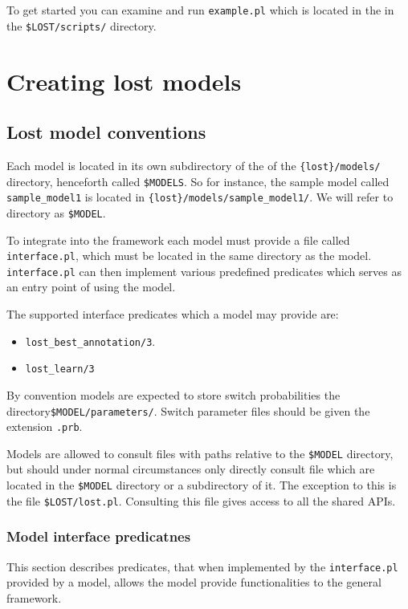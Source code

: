 \documentclass{book}
\begin{document}
To get started you can examine and run \texttt{example.pl} which 
is located in the in the \texttt{\$LOST/scripts/} directory.

\chapter{Creating lost models}

\section{Lost model conventions}\label{sec:lost_model_conventions}

Each model is located in its own subdirectory of the of the
\texttt{\{lost\}/models/} directory, henceforth called \texttt{\$MODELS}. 
So for instance, the sample model called \texttt{sample\_model1} is located in
\texttt{\{lost\}/models/sample\_model1/}. We will refer to directory 
as \texttt{\$MODEL}.

To integrate into the framework each model must provide a file called
\texttt{interface.pl}, which must be located in the same directory as
the model. \texttt{interface.pl} can then implement various predefined
predicates which serves as an entry point of using the
model. 

The supported interface predicates which a model may provide are:
\begin{itemize}
\item \texttt{lost\_best\_annotation/3}.
\item \texttt{lost\_learn/3}
\end{itemize}

By convention models are expected to store switch probabilities the
directory\texttt{\$MODEL/parameters/}. Switch parameter files should
be given the extension \texttt{.prb}.

Models are allowed to consult files with paths relative to the
\texttt{\$MODEL} directory, but should under normal circumstances
only directly consult file which are located in the 
\texttt{\$MODEL} directory or a subdirectory of it.
The exception to this is the file \texttt{\$LOST/lost.pl}. Consulting
this file gives access to all the shared APIs. 

\subsection{Model interface predicatnes}

This section describes predicates, that when implemented by 
the \texttt{interface.pl} provided by a model, allows the 
model provide functionalities to the  general framework.
\end{document}
